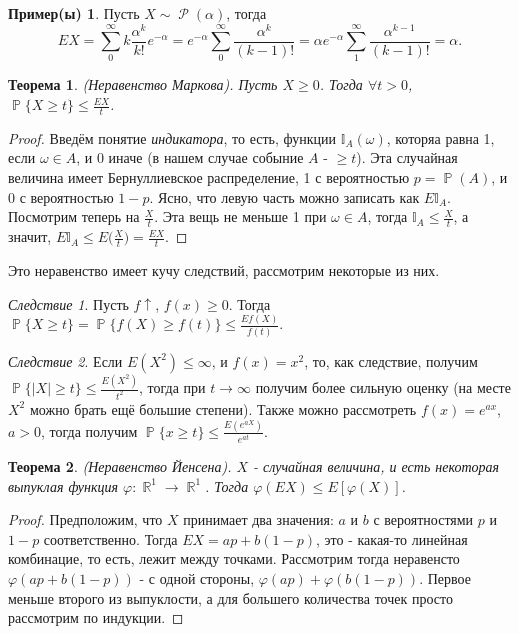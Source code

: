 \documentclass[a4paper,100pt]{article}
\theoremstyle{indented}
\newtheorem{theorem}{Теорема}
\theoremstyle{definition}
\newtheorem{exl}{Пример(ы)}
\theoremstyle{remark}
\newtheorem{cons}{Следствие}
\DeclareMathOperator{\RR}{\mathbb{R}}
\DeclareMathOperator{\PP}{\mathbb{P}}
\DeclareMathOperator{\Rho}{\mathcal{P}}
\begin{document}
\begin{exl}
    Пусть $X\sim \Rho(\alpha)$, тогда 
    \[
        EX = \sum_0^\infty k\frac{\alpha^k}{k!}e^{-\alpha} = e^{-\alpha}\sum_0^\infty \frac{\alpha^k}{(k-1)!} = \alpha e^{-\alpha}\sum_1^\infty \frac{\alpha^{k-1}}{(k-1)!}=\alpha.
    \] 
\end{exl}

\begin{theorem}  
    (Неравенство Маркова). Пусть $X\geq 0$. Тогда $\forall t>0$, $\PP\{X \geq t\}\leq \frac{EX}{t}$.
\end{theorem}

\begin{proof}
    Введём понятие \textit{индикатора}, то есть, функции $\mathbb{I}_A(\omega)$, которяа равна 1, если $\omega \in A$, и 0 иначе (в нашем случае собыние $A$ - $\geq t$). Эта случайная величина имеет Бернуллиевское распределение, 1 с вероятностью $p=\PP(A)$, и 0 с вероятностью $1-p$. Ясно, что левую часть можно записать как $E\mathbb{I}_A$. Посмотрим теперь на $\frac{X}{t}$. Эта вещь не меньше 1 при $\omega \in A$, тогда $\mathbb{I}_A\leq \frac{X}{t}$, а значит, $E \mathbb{I}_A\leq E\biggl(\frac{X}{t}\biggr)=\frac{EX}{t}$. 
\end{proof}

Это неравенство имеет кучу следствий, рассмотрим некоторые из них.

\begin{cons}
    Пусть $f\uparrow$, $f(x)\geq 0$. Тогда $\PP\{X\geq t\}=\PP\{f(X)\geq f(t)\}\leq \frac{Ef(X)}{f(t)}$. 
\end{cons}

\begin{cons}
    Если $E(X^2)\leq \infty$, и $f(x)=x^2$, то, как следствие, получим $\PP\{|X|\geq t\}\leq \frac{E(X^2)}{t^2}$, тогда при $t\rightarrow \infty$ получим более сильную оценку (на месте $X^2$ можно брать ещё большие степени). Также можно рассмотреть $f(x)=e^{ax}$, $a>0$, тогда получим $\PP\{x\geq t\}\leq \frac{E(e^{aX})}{e^{at}}$. 
\end{cons}

\begin{theorem}
    (Неравенство Йенсена). $X$ - случайная величина, и есть некоторая выпуклая функция $\varphi: \RR^1\rightarrow \RR^1$. Тогда $\varphi(EX)\leq E[\varphi(X)]$.  
\end{theorem}

\begin{proof}
    Предположим, что $X$ принимает два значения: $a$ и $b$ с вероятностями $p$ и $1-p$ соответственно. Тогда $EX=ap+b(1-p)$, это - какая-то линейная комбинацие, то есть, лежит между точками. Рассмотрим тогда неравенсто $\varphi(ap+b(1-p))$ - с одной стороны, $\varphi(ap)+\varphi(b(1-p))$. Первое меньше второго из выпуклости, а для большего количества точек просто рассмотрим по индукции. 
\end{proof}
\end{document}
